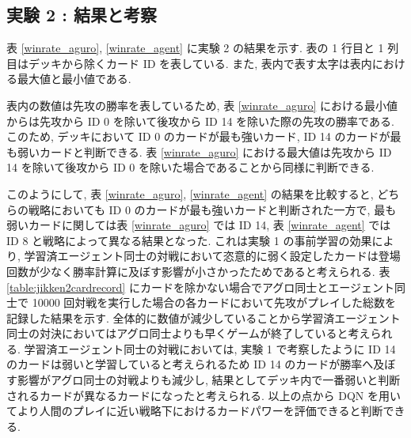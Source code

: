 \documentclass[12pt]{jarticle}
\begin{document}
\subsection{実験 2 : 結果と考察}
表 \ref{winrate_aguro}, \ref{winrate_agent} に実験 2 の結果を示す. 表の 1 行目と 1 列目はデッキから除くカード ID を表している. また, 表内で表す太字は表内における最大値と最小値である. 
\par
表内の数値は先攻の勝率を表しているため, 表 \ref{winrate_aguro} における最小値からは先攻から ID 0 を除いて後攻から ID 14 を除いた際の先攻の勝率である. このため, デッキにおいて ID 0 のカードが最も強いカード, ID 14 のカードが最も弱いカードと判断できる. 表 \ref{winrate_aguro} における最大値は先攻から ID 14 を除いて後攻から ID 0 を除いた場合であることから同様に判断できる.
\par
このようにして,  表 \ref{winrate_aguro}, \ref{winrate_agent} の結果を比較すると, どちらの戦略においても ID 0 のカードが最も強いカードと判断された一方で, 最も弱いカードに関しては表 \ref{winrate_aguro} では ID 14, 表 \ref{winrate_agent} では ID 8 と戦略によって異なる結果となった.
これは実験 1 の事前学習の効果により, 学習済エージェント同士の対戦において恣意的に弱く設定したカードは登場回数が少なく勝率計算に及ぼす影響が小さかったためであると考えられる. 
表 \ref{table:jikken2cardrecord} にカードを除かない場合でアグロ同士とエージェント同士で 10000 回対戦を実行した場合の各カードにおいて先攻がプレイした総数を記録した結果を示す.
全体的に数値が減少していることから学習済エージェント同士の対決においてはアグロ同士よりも早くゲームが終了していると考えられる.
学習済エージェント同士の対戦においては, 実験 1 で考察したように ID 14 のカードは弱いと学習していると考えられるため ID 14 のカードが勝率へ及ぼす影響がアグロ同士の対戦よりも減少し, 結果としてデッキ内で一番弱いと判断されるカードが異なるカードになったと考えられる.
以上の点から DQN を用いてより人間のプレイに近い戦略下におけるカードパワーを評価できると判断できる. 
\end{document}

